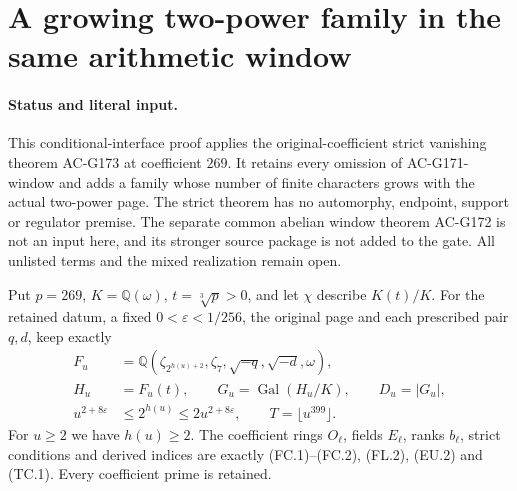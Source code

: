 \section{A growing two-power family in the same arithmetic window}
\label{sec:two-power-uniform-actual-window}

\paragraph{Status and literal input.}
This conditional-interface proof applies the original-coefficient strict
vanishing theorem AC-G173 at coefficient $269$.
It retains every omission of AC-G171-window and adds a family whose
number of finite characters grows with the actual two-power page.
The strict theorem has no automorphy, endpoint, support or regulator
premise.  The separate common abelian window theorem AC-G172 is not an
input here, and its stronger source package is not added to the gate.
All unlisted terms and the mixed realization remain open.

Put $p=269$, $K=\mathbb Q(\omega)$, $t=\sqrt[3]p>0$, and let
$\chi$ describe $K(t)/K$.  For the retained datum, a fixed
$0<\varepsilon<1/256$, the original page and each prescribed pair $q,d$,
keep exactly
\[
 \begin{aligned}
 F_u&=\mathbb Q(\zeta_{2^{h(u)+2}},\zeta_7,
                                  \sqrt{-q},\sqrt{-d},\omega),\\
 H_u&=F_u(t),\qquad G_u=\operatorname{Gal}(H_u/K),\qquad D_u=|G_u|,\\
 u^{2+8\varepsilon}&\leq2^{h(u)}\leq2u^{2+8\varepsilon},
                      \qquad T=\lfloor u^{399}\rfloor .
 \end{aligned}
 \tag{TPW.1}
\]
For $u\geq2$ we have $h(u)\geq2$.
The coefficient rings $O_\ell$, fields $E_\ell$, ranks $b_\ell$,
strict conditions and derived indices are exactly (FC.1)--(FC.2),
(FL.2), (EU.2) and (TC.1).  Every coefficient prime is retained.


